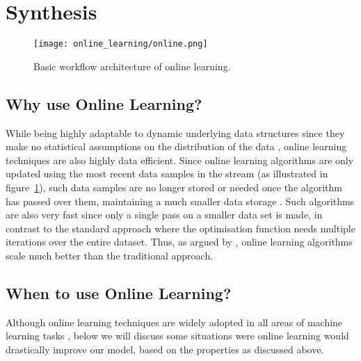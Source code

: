 \section{Synthesis}

\begin{figure}
  \texttt{[image: online\_learning/online.png]}
  \caption{Basic workflow architecture of online learning.}
  \label{fig:online_ml}
\end{figure}

\subsection{Why use Online Learning?}

While being highly adaptable to dynamic underlying data structures since they make no statistical assumptions on the distribution of the data \citep{hoi_libol:_2014}, online learning techniques are also highly data efficient. Since online learning algorithms are only updated using the most recent data samples in the stream (as illustrated in figure~\ref{fig:online_ml}), such data samples are no longer stored or needed once the algorithm has passed over them, maintaining a much smaller data storage \citep{oza_online_2005}. Such algorithms are also very fast since only a single pass on a smaller data set is made, in contrast to the standard approach where the optimisation function needs multiple iterations over the entire dataset. Thus, as argued by \citet{hoi_online_2018}, online learning algorithms scale much better than the traditional approach.

\subsection{When to use Online Learning?}

Although online learning techniques are widely adopted in all areas of machine learning tasks \citep{hoi_online_2018}, below we will discuss some situations were online learning would drastically improve our model, based on the properties as discussed above.

